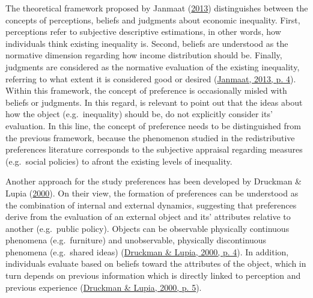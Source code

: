 \documentclass[
  12pt,
]{book}
\begin{document}
The theoretical framework proposed by Janmaat (\protect\hyperlink{ref-Janmaat2013}{2013}) distinguishes between the concepts of perceptions, beliefs and judgments about economic inequality. First, perceptions refer to subjective descriptive estimations, in other words, how individuals think existing inequality is. Second, beliefs are understood as the normative dimension regarding how income distribution should be. Finally, judgments are considered as the normative evaluation of the existing inequality, referring to what extent it is considered good or desired (\protect\hyperlink{ref-Janmaat2013}{Janmaat, 2013, p. 4}). Within this framework, the concept of preference is occasionally misled with beliefs or judgments. In this regard, is relevant to point out that the ideas about how the object (e.g.~inequality) should be, do not explicitly consider its' evaluation. In this line, the concept of preference needs to be distinguished from the previous framework, because the phenomenon studied in the redistributive preferences literature corresponds to the subjective appraisal regarding measures (e.g.~social policies) to afront the existing levels of inequality.

Another approach for the study preferences has been developed by Druckman \& Lupia (\protect\hyperlink{ref-druckman_preference_2000}{2000}). On their view, the formation of preferences can be understood as the combination of internal and external dynamics, suggesting that preferences derive from the evaluation of an external object and its' attributes relative to another (e.g.~public policy). Objects can be observable physically continuous phenomena (e.g.~furniture) and unobservable, physically discontinuous phenomena (e.g.~shared ideas) (\protect\hyperlink{ref-druckman_preference_2000}{Druckman \& Lupia, 2000, p. 4}). In addition, individuals evaluate based on beliefs toward the attributes of the object, which in turn depends on previous information which is directly linked to perception and previous experience (\protect\hyperlink{ref-druckman_preference_2000}{Druckman \& Lupia, 2000, p. 5}).
\end{document}
